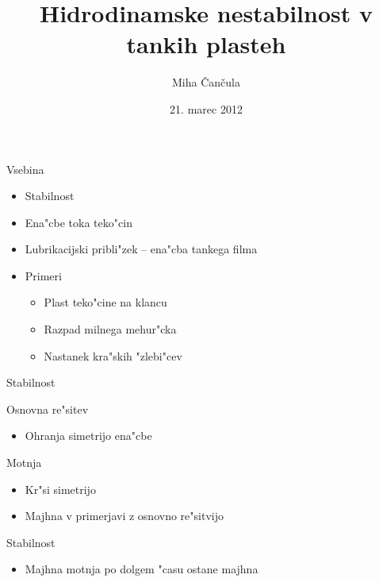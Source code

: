 \documentclass{beamer}
\date{21. marec 2012}
\title{Hidrodinamske nestabilnost v tankih plasteh}
\author{Miha \v Can\v cula}
\begin{document}
\frame{\titlepage}

\begin{frame}{Vsebina}
 \begin{itemize}
  \item Stabilnost
  \item Ena"cbe toka teko"cin
  \item Lubrikacijski pribli"zek -- ena"cba tankega filma
  \item Primeri
  \begin{itemize}
    \item{Plast teko"cine na klancu}
    \item{Razpad milnega mehur"cka}
    \item{Nastanek kra"skih "zlebi"cev}
  \end{itemize}
 \end{itemize}
\end{frame}


\begin{frame}{Stabilnost}
\begin{block}{Osnovna re"sitev}
 \begin{itemize}
  \item Ohranja simetrijo ena"cbe
 \end{itemize}
\end{block}

\begin{block}{Motnja}
 \begin{itemize}
 \item Kr"si simetrijo
 \item Majhna v primerjavi z osnovno re"sitvijo
 \end{itemize}
 \end{block}
 
 \begin{block}{Stabilnost}
 \begin{itemize}
  \item Majhna motnja po dolgem "casu ostane majhna
 \end{itemize}
 \end{block}

\end{frame}
\end{document}
